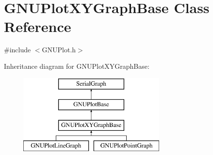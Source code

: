 \hypertarget{class_g_n_u_plot_x_y_graph_base}{}\section{G\+N\+U\+Plot\+X\+Y\+Graph\+Base Class Reference}
\label{class_g_n_u_plot_x_y_graph_base}


{\ttfamily \#include $<$G\+N\+U\+Plot.\+h$>$}

Inheritance diagram for G\+N\+U\+Plot\+X\+Y\+Graph\+Base\+:\begin{figure}[H]
\begin{center}
\leavevmode
\includegraphics[height=4.000000cm]{class_g_n_u_plot_x_y_graph_base}
\end{center}
\end{figure}
